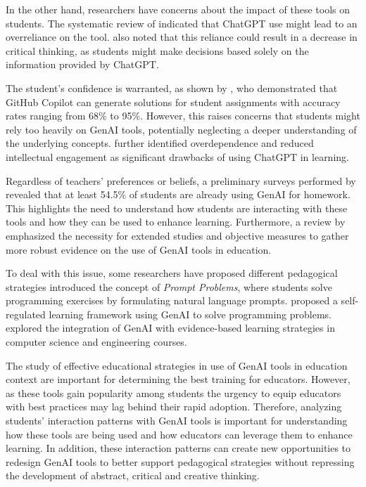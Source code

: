 \documentclass[a4paper,twoside]{article}
\begin{document}
In the other hand, researchers have concerns about the impact of these
tools on students. The systematic review of \cite{Murillo23} indicated that
ChatGPT use might lead to an overreliance on the tool. \cite{chan23} also noted
that this reliance could result in a decrease in critical thinking, as students
might make decisions based solely on the information provided by ChatGPT.

The student's confidence is warranted, as shown by \cite{Puryear22}, who
demonstrated that GitHub Copilot can generate solutions for student assignments
with accuracy rates ranging from 68\% to 95\%. However, this raises concerns that
students might rely too heavily on GenAI tools, potentially neglecting a deeper
understanding of the underlying concepts. \cite{cai23} further identified
overdependence and reduced intellectual engagement as significant drawbacks of
using ChatGPT in learning.

Regardless of teachers' preferences or beliefs, a preliminary surveys performed
by \cite{Dickey24} revealed that at least 54.5\% of students are already using
GenAI for homework. This highlights the need to understand how students are
interacting with these tools and how they can be used to enhance learning.
Furthermore, a review by \cite{Lo24} emphasized the necessity for extended
studies and objective measures to gather more robust evidence on the use of
GenAI tools in education.


To deal with this issue, some researchers have proposed different pedagogical
strategies \cite{Denny24} introduced the concept of \textit{Prompt
Problems}, where students solve programming exercises by formulating natural
language prompts. \cite{Prasad24} proposed a self-regulated learning framework
using GenAI to solve programming problems. \cite{Lauren23} explored the
integration of GenAI with evidence-based learning strategies in computer science
and engineering courses.


The study of effective educational strategies in use of GenAI tools in education
context are important for determining the best training for educators. However,
as these tools gain popularity among students \cite{Dickey24} the urgency to
equip educators with best practices may lag behind their rapid adoption.
Therefore, analyzing students' interaction patterns with GenAI tools is
important for understanding how these tools are being used and how educators can
leverage them to enhance learning. In addition, these interaction patterns can
create new opportunities to redesign GenAI tools to better support pedagogical
strategies without repressing the development of abstract, critical and creative
thinking.
\end{document}
